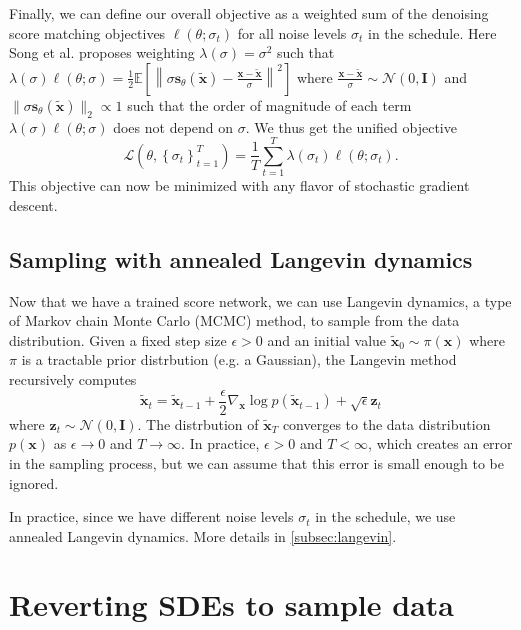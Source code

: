 \documentclass{article}
\begin{document}
Finally, we can define our overall objective as a weighted sum of the denoising score matching objectives $\ell(\theta; \sigma_t)$ for all noise levels $\sigma_t$ in the schedule.
Here Song et al. proposes weighting $\lambda(\sigma) = \sigma^2$ such that $\lambda(\sigma)\ell(\theta; \sigma)=\frac{1}{2}\mathbb{E} \left[ \left\| \sigma\mathbf{s}_\theta(\tilde {\mathbf{x}}) - \frac{\mathbf{x} - \tilde {\mathbf{x}}}{\sigma} \right\|^2 \right]$
where $\frac{\mathbf{x} - \tilde {\mathbf{x}}}{\sigma} \sim \mathcal{N}(0, \mathbf{I})$ and $\| \sigma \mathbf{s}_\theta(\tilde {\mathbf{x}}) \|_2 \propto1$ such that the order
of magnitude of each term $\lambda(\sigma)\ell(\theta; \sigma)$ does not depend on $\sigma$.
We thus get the unified objective
\begin{equation}
    \label{eq:score-unified}
    \mathcal{L}(\theta, \left \{ \sigma_t\right \} _{t=1}^T) = \frac{1}{T} \sum_{t=1}^T \lambda(\sigma_t) \ell(\theta; \sigma_t).
\end{equation}
This objective can now be minimized with any flavor of stochastic gradient descent.

\subsection{Sampling with annealed Langevin dynamics}
Now that we have a trained score network, we can use Langevin dynamics, a type of Markov chain Monte Carlo (MCMC) method, to sample from the data distribution.
Given a fixed step size $\epsilon>0$ and an initial value $\tilde {\mathbf{x}}_0 \sim \pi(\mathbf{x})$ where $\pi$ is a tractable prior distrbution (e.g. a Gaussian), the Langevin
method recursively computes
\begin{equation}
    \tilde {\mathbf{x}}_{t} = \tilde {\mathbf{x}}_{t-1} + \frac{\epsilon}{2} \nabla_\mathbf{x} \log p(\tilde {\mathbf{x}}_{t-1}) + \sqrt{\epsilon}\mathbf{z}_t
\end{equation}
where $\mathbf{z}_t \sim \mathcal{N}(0, \mathbf{I})$. The distrbution of $\tilde {\mathbf{x}}_T$ converges to the data distribution $p(\mathbf{x})$ as $\epsilon \to 0$ and $T \to \infty$.
In practice, $\epsilon>0$ and $T<\infty$, which creates an error in the sampling process, but we can assume that this error is small enough to be ignored.

In practice, since we have different noise levels $\sigma_t$ in the schedule, we use annealed Langevin dynamics. More details in \ref{subsec:langevin}.


\section{Reverting SDEs to sample data} \label{sec:sde}
\end{document}
